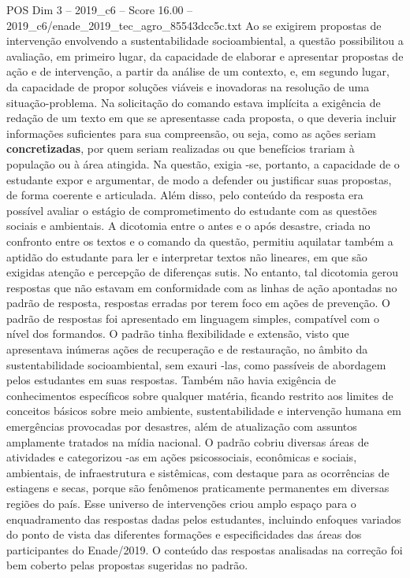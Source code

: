 \begin{textsample}{POS Dim 3 – 2019\_c6 – Score 16.00 – 2019\_c6/enade\_2019\_tec\_agro\_85543dcc5c.txt}
Ao se exigirem propostas de intervenção envolvendo a sustentabilidade socioambiental, a questão possibilitou a avaliação, em primeiro lugar, da capacidade de elaborar e apresentar propostas de ação e de intervenção, a partir da análise de um contexto, e, em segundo lugar, da capacidade de propor soluções viáveis e inovadoras na resolução de uma situação-problema.
Na solicitação do comando estava implícita a exigência de redação de um texto em que se apresentasse cada proposta, o que deveria incluir informações suficientes para sua compreensão, ou seja, como as ações seriam \textbf{concretizadas}, por quem seriam realizadas ou que benefícios trariam à população ou à área atingida.
Na questão, exigia -se, portanto, a capacidade de o estudante expor e argumentar, de modo a defender ou justificar suas propostas, de forma coerente e articulada.
Além disso, pelo conteúdo da resposta era possível avaliar o estágio de comprometimento do estudante com as questões sociais e ambientais.
A dicotomia entre o antes e o após desastre, criada no confronto entre os textos e o comando da questão, permitiu aquilatar também a aptidão do estudante para ler e interpretar textos não lineares, em que são exigidas atenção e percepção de diferenças sutis.
No entanto, tal dicotomia gerou respostas que não estavam em conformidade com as linhas de ação apontadas no padrão de resposta, respostas erradas por terem foco em ações de prevenção.
O padrão de respostas foi apresentado em linguagem simples, compatível com o nível dos formandos.
O padrão tinha flexibilidade e extensão, visto que apresentava inúmeras ações de recuperação e de restauração, no âmbito da sustentabilidade socioambiental, sem exauri -las, como passíveis de abordagem pelos estudantes em suas respostas.
Também não havia exigência de conhecimentos específicos sobre qualquer matéria, ficando restrito aos limites de conceitos básicos sobre meio ambiente, sustentabilidade e intervenção humana em emergências provocadas por desastres, além de atualização com assuntos amplamente tratados na mídia nacional.
O padrão cobriu diversas áreas de atividades e categorizou -as em ações psicossociais, econômicas e sociais, ambientais, de infraestrutura e sistêmicas, com destaque para as ocorrências de estiagens e secas, porque são fenômenos praticamente permanentes em diversas regiões do país.
Esse universo de intervenções criou amplo espaço para o enquadramento das respostas dadas pelos estudantes, incluindo enfoques variados do ponto de vista das diferentes formações e especificidades das áreas dos participantes do Enade/2019.
O conteúdo das respostas analisadas na correção foi bem coberto pelas propostas sugeridas no padrão.

\end{textsample}
